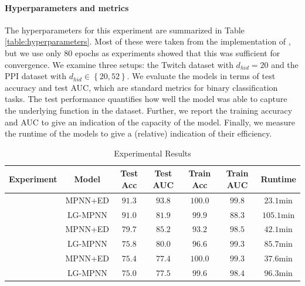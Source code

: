 \documentclass{article}
\newcommand{\set}[1]{\left\{#1\right\}}
\begin{document}
\paragraph{Hyperparameters and metrics} The hyperparameters for this experiment are summarized in Table \ref{table:hyperparameters}. Most of these were taken from the implementation of \cite{cai2021line}, but we use only 80 epochs as experiments showed that this was sufficient for convergence. We examine three setups: the Twitch dataset with $d_{hid}=20$ and the PPI dataset with $d_{hid}\in\set{20,52}$.
We evaluate the models in terms of test accuracy and test AUC, which are standard metrics for binary classification tasks. The test performance quantifies how well the model was able to capture the underlying function in the dataset. Further, we report the training accuracy and AUC to give an indication of the capacity of the model. Finally, we measure the runtime of the models to give a (relative) indication of their efficiency.


\begin{table}[ht]
    \centering
    \caption{Experimental Results}
    \label{tab:results}
    \begin{tabular}{ccccccc}
        \textbf{Experiment} & \textbf{Model} & \textbf{Test Acc} & \textbf{Test AUC} & \textbf{Train Acc} & \textbf{Train AUC} & \textbf{Runtime} \\
        \hline
        & MPNN+ED & $91.3$ & $93.8$ & $100.0$ & $99.8$ & $23.1\text{min}$ \\
        & LG-MPNN & $91.0$ & $81.9$ & $99.9$ & $88.3$ & $105.1\text{min}$ \\
        \hline
        & MPNN+ED & $79.7$ & $85.2$ & $93.2$ & $98.5$ & $42.1\text{min}$ \\
        & LG-MPNN & $75.8$ & $80.0$ & $96.6$ & $99.3$ & $85.7\text{min}$ \\
        \hline
        & MPNN+ED & $75.4$ & $77.4$ & $100.0$ & $99.3$ & $37.6\text{min}$ \\    
        & LG-MPNN & $75.0$ & $77.5$ & $99.6$ & $98.4$ & $96.3\text{min}$ \\
        \hline
    \end{tabular}
\end{table}
\end{document}
